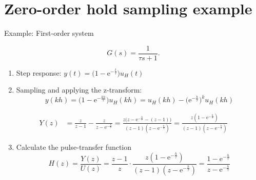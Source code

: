 \documentclass[presentation,aspectratio=169]{beamer}
\begin{document}
\section{Zero-order hold sampling example}
\label{sec:org52f7c74}
\begin{frame}[label={sec:org5f312bc}]{Example: First-order system}
\small

\[ G(s) = \frac{1}{\tau s + 1}. \]

\pause
\begin{enumerate}
\item Step response: \(y(t) = \big(1 - \mathrm{e}^{-\frac{t}{\tau}}\big)u_H(t)\)
\end{enumerate}
\pause
\begin{enumerate}
\setcounter{enumi}{1}
\item Sampling and applying the z-transform:
\[ y(kh) = \big(1 - \mathrm{e}^{-\frac{kh}{\tau}}\big)u_H(kh) = u_H(kh) - \big(\mathrm{e}^{-\frac{h}{\tau}}\big)^k u_H(kh) \]
\end{enumerate}
\pause
\begin{align*} Y(z) &= \frac{z}{z-1} - \frac{z}{z-\mathrm{e}^{-\frac{h}{\tau}}} = \frac{z\big(z-\mathrm{e}^{-\frac{h}{\tau}} - (z-1)\big)}{(z-1)(z-\mathrm{e}^{-\frac{h}{\tau}})}
= \frac{z(1-\mathrm{e}^{-\frac{h}{\tau}})}{(z-1)(z-\mathrm{e}^{-\frac{h}{\tau}})}
\end{align*}
\pause
\begin{enumerate}
\setcounter{enumi}{2}
\item Calculate the pulse-transfer function
\[H(z) = \frac{Y(z)}{U(z)} = \frac{z-1}{z} \cdot \frac{z(1-\mathrm{e}^{-\frac{h}{\tau}})}{(z-1)(z-\mathrm{e}^{-\frac{h}{\tau}})} = \frac{1-\mathrm{e}^{-\frac{h}{\tau}}}{z-\mathrm{e}^{-\frac{h}{\tau}}} \]
\end{enumerate}
\end{frame}
\end{document}
